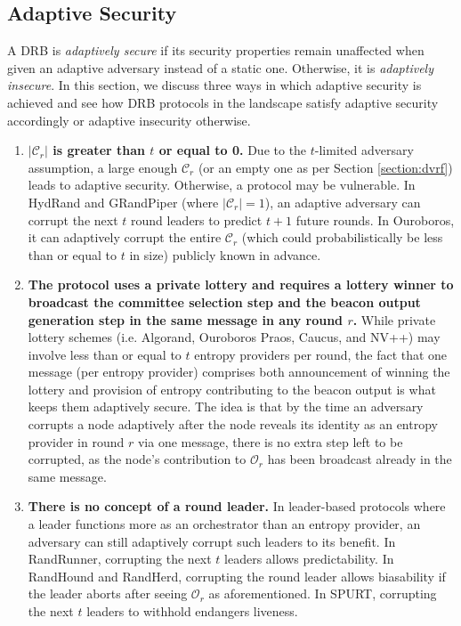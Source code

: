 \documentclass[letterpaper,twocolumn,10pt]{article}
\theoremstyle{definition}
\theoremstyle{remark}
\begin{document}
\subsection{Adaptive Security}
\label{subsection:adaptive}
A DRB is \textit{adaptively secure} if its security properties remain unaffected when given an adaptive adversary instead of a static one. Otherwise, it is \textit{adaptively insecure}. In this section, we discuss three ways in which adaptive security is achieved and see how DRB protocols in the landscape satisfy adaptive security accordingly or adaptive insecurity otherwise.

\begin{enumerate}
\item \textbf{$|\mathcal{C}_r|$ is greater than $t$ or equal to 0.} Due to the $t$-limited adversary assumption, a large enough $\mathcal{C}_r$ (or an empty one as per Section \ref{section:dvrf}) leads to adaptive security. Otherwise, a protocol may be vulnerable. In HydRand and GRandPiper (where $|\mathcal{C}_r| = 1$), an adaptive adversary can corrupt the next $t$ round leaders to predict $t + 1$ future rounds. In Ouroboros, it can adaptively corrupt the entire $\mathcal{C}_r$ (which could probabilistically be less than or equal to $t$ in size) publicly known in advance.
\item \textbf{The protocol uses a private lottery and requires a lottery winner to broadcast the committee selection step and the beacon output generation step in the same message in any round $r$.} While private lottery schemes (i.e. Algorand, Ouroboros Praos, Caucus, and NV++) may involve less than or equal to $t$ entropy providers per round, the fact that one message (per entropy provider) comprises both announcement of winning the lottery and provision of entropy contributing to the beacon output is what keeps them adaptively secure. The idea is that by the time an adversary corrupts a node adaptively after the node reveals its identity as an entropy provider in round $r$ via one message, there is no extra step left to be corrupted, as the node's contribution to $\mathcal{O}_r$ has been broadcast already in the same message.
\item \textbf{There is no concept of a round leader.} In leader-based protocols where a leader functions more as an orchestrator than an entropy provider, an adversary can still adaptively corrupt such leaders to its benefit. In RandRunner, corrupting the next $t$ leaders allows predictability. In RandHound and RandHerd, corrupting the round leader allows biasability if the leader aborts after seeing $\mathcal{O}_r$ as aforementioned. In SPURT, corrupting the next $t$ leaders to withhold endangers liveness.
\end{enumerate}
\end{document}
